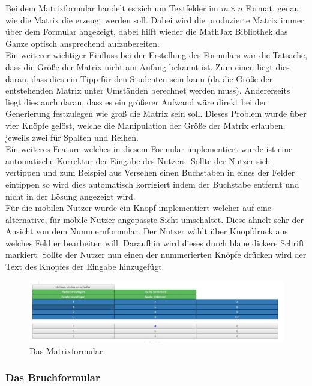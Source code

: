 Bei dem Matrixformular handelt es sich um Textfelder im $ m\times n$ Format, genau wie die Matrix die erzeugt werden soll. Dabei wird die produzierte Matrix immer über dem Formular angezeigt, dabei hilft wieder die MathJax Bibliothek das Ganze optisch ansprechend aufzubereiten. \\

Ein weiterer wichtiger Einfluss bei der Erstellung des Formulars war die Tatsache, dass die Größe der Matrix nicht am Anfang bekannt ist. Zum einen liegt dies daran, dass dies ein Tipp für den Studenten sein kann (da die Größe der entstehenden Matrix unter Umständen berechnet werden muss). Andererseits liegt dies auch daran, dass es ein größerer Aufwand wäre direkt bei der Generierung festzulegen wie groß die Matrix sein soll. Dieses Problem wurde über vier Knöpfe gelöst, welche die Manipulation der Größe der Matrix erlauben, jeweils zwei für Spalten und Reihen. \\

Ein weiteres Feature welches in diesem Formular implementiert wurde ist eine automatische Korrektur der Eingabe des Nutzers. Sollte der Nutzer sich vertippen und zum Beispiel aus Versehen einen Buchstaben in eines der Felder eintippen so wird dies automatisch korrigiert indem der Buchstabe entfernt und nicht in der Lösung angezeigt wird. \\

Für die mobilen Nutzer wurde ein Knopf implementiert welcher auf eine alternative, für mobile Nutzer angepasste Sicht umschaltet. Diese ähnelt sehr der Ansicht von dem Nummernformular. Der Nutzer wählt über Knopfdruck aus welches Feld er bearbeiten will. Daraufhin wird dieses durch blaue dickere Schrift markiert. Sollte der Nutzer nun einen der nummerierten Knöpfe drücken wird der Text des Knopfes der Eingabe hinzugefügt.


\begin{figure}[htp]     %
\centering
\includegraphics[width=1\textwidth]{bilder/MatrixMobile} 
\caption[Das Matrixformular]{Das Matrixformular}
\end{figure} 


\subsubsection{Das Bruchformular}

